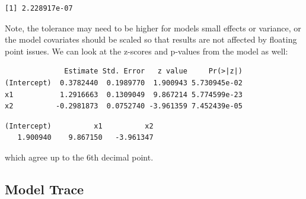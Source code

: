 \documentclass[]{elsarticle} %
\newenvironment{Shaded}{\begin{snugshade}}{\end{snugshade}}
\newcommand{\KeywordTok}[1]{\textcolor[rgb]{0.13,0.29,0.53}{\textbf{#1}}}
\newcommand{\NormalTok}[1]{#1}
\newcommand{\OperatorTok}[1]{\textcolor[rgb]{0.81,0.36,0.00}{\textbf{#1}}}
\newcommand{\StringTok}[1]{\textcolor[rgb]{0.31,0.60,0.02}{#1}}
\begin{document}
\begin{Shaded}
\end{Shaded}

\begin{verbatim}
[1] 2.228917e-07
\end{verbatim}

Note, the tolerance may need to be higher for models small effects or variance, or the model covariates should be scaled so that results are not affected by floating point issues. We can look at the z-scores and p-values from the model as well:

\begin{Shaded}
\end{Shaded}

\begin{verbatim}
              Estimate Std. Error   z value     Pr(>|z|)
(Intercept)  0.3782440  0.1989770  1.900943 5.730945e-02
x1           1.2916663  0.1309049  9.867214 5.774599e-23
x2          -0.2981873  0.0752740 -3.961359 7.452439e-05
\end{verbatim}

\begin{Shaded}
\end{Shaded}

\begin{verbatim}
(Intercept)          x1          x2 
   1.900940    9.867150   -3.961347 
\end{verbatim}

which agree up to the 6th decimal point.

\hypertarget{model-trace}{%
\subsection{Model Trace}\label{model-trace}}
\end{document}
